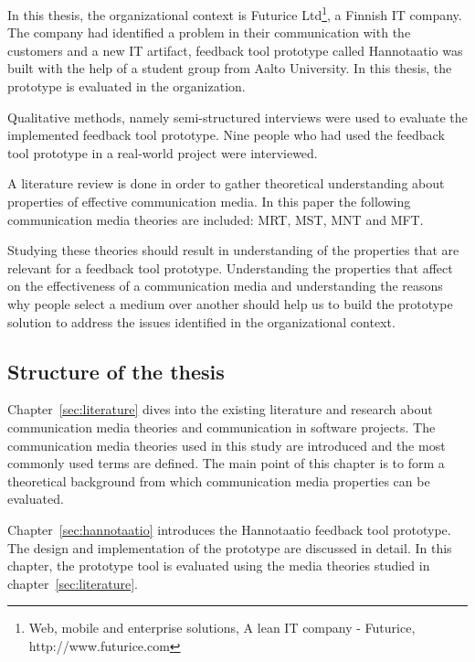 \documentclass[english,12pt,a4paper,pdftex]{article}
\begin{document}
In this thesis, the organizational context is Futurice Ltd\footnote{Web, mobile and enterprise solutions, A lean IT company - Futurice, http://www.futurice.com}, a Finnish IT company. The company had identified a problem in their communication with the customers and a new IT artifact, feedback tool prototype called Hannotaatio was built with the help of a student group from Aalto University. In this thesis, the prototype is evaluated in the organization.

Qualitative methods, namely semi-structured interviews were used to evaluate the implemented feedback tool prototype. Nine people who had used the feedback tool prototype in a real-world project were interviewed.


A literature review is done in order to gather theoretical understanding about properties of effective communication media. In this paper the following communication media theories are included: \ac{MRT}, \ac{MST}, \ac{MNT} and \ac{MFT}. 

Studying these theories should result in understanding of the properties that are relevant for a feedback tool prototype. Understanding the properties that affect on the effectiveness of a communication media and understanding the reasons why people select a medium over another should help us to build the prototype solution to address the issues identified in the organizational context.

\subsection{Structure of the thesis}

Chapter~\ref{sec:literature} dives into the existing literature and research about communication media theories and communication in software projects. The communication media theories used in this study are introduced and the most commonly used terms are defined. The main point of this chapter is to form a theoretical background from which communication media properties can be evaluated.

Chapter~\ref{sec:hannotaatio} introduces the Hannotaatio feedback tool prototype. The design and implementation of the prototype are discussed in detail. In this chapter, the prototype tool is evaluated using the media theories studied in chapter~\ref{sec:literature}.
\end{document}
